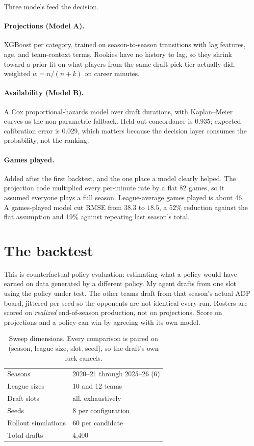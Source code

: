 \documentclass[11pt]{article}
\begin{document}
Three models feed the decision.

\paragraph{Projections (Model A).}
XGBoost per category, trained on season-to-season transitions with lag features,
age, and team-context terms. Rookies have no history to lag, so they shrink
toward a prior fit on what players from the same draft-pick tier actually did,
weighted $w = n/(n+k)$ on career minutes.

\paragraph{Availability (Model B).}
A Cox proportional-hazards model over draft durations, with Kaplan--Meier curves
as the non-parametric fallback. Held-out concordance is $0.935$; expected
calibration error is $0.029$, which matters because the decision layer consumes
the probability, not the ranking.

\paragraph{Games played.}
Added after the first backtest, and the one place a model clearly helped. The
projection code multiplied every per-minute rate by a flat 82 games, so it assumed
everyone plays a full season. League-average games played is about 46. A
games-played model cut RMSE from $38.3$ to $18.5$, a 52\% reduction against the
flat assumption and 19\% against repeating last season's total.

\section{The backtest}

This is counterfactual policy evaluation: estimating what a policy would have
earned on data generated by a different policy. My agent drafts from one slot
using the policy under test. The other teams draft from that season's actual ADP
board, jittered per seed so the opponents are not identical every run. Rosters are
scored on \emph{realized} end-of-season production, not on projections. Score
on projections and a policy can win by agreeing with its own model.

\begin{table}[h]
\centering
\caption{Sweep dimensions. Every comparison is paired on
(season, league size, slot, seed), so the draft's own luck cancels.}
\begin{tabular}{ll}
\toprule
Seasons & 2020--21 through 2025--26 (6) \\
League sizes & 10 and 12 teams \\
Draft slots & all, exhaustively \\
Seeds & 8 per configuration \\
Rollout simulations & 60 per candidate \\
Total drafts & 4{,}400 \\
\bottomrule
\end{tabular}
\end{table}
\end{document}

